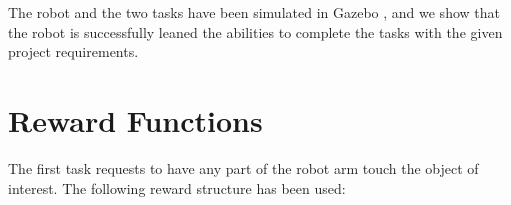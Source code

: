 \documentclass[10pt,journal,compsoc]{IEEEtran}
\begin{document}
The robot and the two tasks have been simulated in Gazebo \cite{288}, and we show that the robot is successfully leaned the abilities to complete the tasks with the given project requirements. 



%
%
%



   

\section{Reward Functions}

The first task requests to have any part of the robot arm touch the object of interest. The following reward structure has been used:
\end{document}
